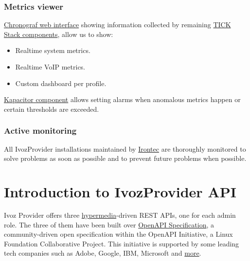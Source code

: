 \documentclass[letterpaper,10pt,english]{sphinxmanual}
\begin{document}
\subsection{Metrics viewer}
\label{security_and_maintenance/maintenance/other_tools:metrics-viewer}
\href{https://www.influxdata.com/time-series-platform/chronograf/}{Chronograf web interface}
showing information collected by remaining \href{https://www.influxdata.com/time-series-platform/}{TICK Stack components},
allow us to show:
\begin{itemize}
\item {} 
Realtime system metrics.

\item {} 
Realtime VoIP metrics.

\item {} 
Custom dashboard per profile.

\end{itemize}

\href{https://www.influxdata.com/time-series-platform/kapacitor/}{Kapacitor component} allows setting alarms when anomalous
metrics happen or certain thresholds are exceeded.


\subsection{Active monitoring}
\label{security_and_maintenance/maintenance/other_tools:active-monitoring}
All IvozProvider installations maintained by \href{https://www.irontec.com}{Irontec} are thoroughly monitored to solve problems
as soon as possible and to prevent future problems when possible.


\chapter{Introduction to IvozProvider API}
\label{api_rest/introduction:introduction-to-ivozprovider-api}\label{api_rest/introduction::doc}
Ivoz Provider offers three \href{https://en.wikipedia.org/wiki/HATEOAS}{hypermedia}-driven REST APIs, one for each admin role. The three of them have been built over
\href{https://www.openapis.org/}{OpenAPI Specification}, a community-driven open specification within the OpenAPI
Initiative, a Linux Foundation Collaborative Project. This initiative is supported by some leading tech companies
such as Adobe, Google, IBM, Microsoft and \href{https://www.openapis.org/membership/members)}{more}.
\end{document}
